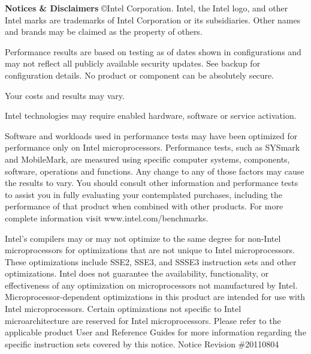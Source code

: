 \begin{framed}
\scriptsize

\noindent \textbf{Notices \& Disclaimers}
\copyright  Intel Corporation.  Intel, the Intel logo, and other Intel marks are trademarks of Intel Corporation or its subsidiaries.  Other names and brands may be claimed as the property of others.

Performance results are based on testing as of dates shown in configurations and may not reflect all publicly available security updates.  See backup for configuration details.  No product or component can be absolutely secure.

Your costs and results may vary.

Intel technologies may require enabled hardware, software or service activation.

Software and workloads used in performance tests may have been optimized for performance only on Intel microprocessors.  Performance tests, such as SYSmark and MobileMark, are measured using specific computer systems, components, software, operations and functions.  Any change to any of those factors may cause the results to vary.  You should consult other information and performance tests to assist you in fully evaluating your contemplated purchases, including the performance of that product when combined with other products.   For more complete information visit www.intel.com/benchmarks.

Intel's compilers may or may not optimize to the same degree for non-Intel microprocessors for optimizations that are not unique to Intel microprocessors. These optimizations include SSE2, SSE3, and SSSE3 instruction sets and other optimizations. Intel does not guarantee the availability, functionality, or effectiveness of any optimization on microprocessors not manufactured by Intel. Microprocessor-dependent optimizations in this product are intended for use with Intel microprocessors. Certain optimizations not specific to Intel microarchitecture are reserved for Intel microprocessors. Please refer to the applicable product User and Reference Guides for more information regarding the specific instruction sets covered by this notice.  Notice Revision \#20110804
\end{framed}
